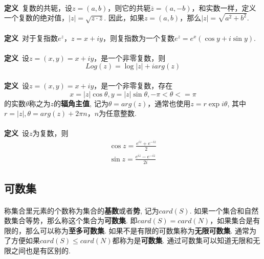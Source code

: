 \paragraph{}
\textbf{定义}\, 复数的共轭，设$z = (a, b)$，则它的共轭$\overline{z} = (a, -b)$，和实数一样，定义一个复数的绝对值，$|z| = \sqrt{z\cdot \overline{z}}$. 因此，如果$z = (a, b)$，那么$|z| = \sqrt{a^2 + b^2}$.
\paragraph{}
\textbf{定义}\, 对于复指数$e^z$，$z = x + iy$，则复指数为一个复数$e^z = e^x(\cos{y} + i\sin{y})$.

\paragraph{}
\textbf{定义}\, 设$z = (x, y) = x + iy$，是一个非零复数，则
$$
Log(z) = \log{|z|} + iarg(z)
$$


\paragraph{}
\textbf{定义}\, 设$z = (x, y) = x + iy$，是一个非零复数，存在
$$
x = |z|\cos{\theta}, y = |z|\sin{\theta}, -\pi < \theta <= \pi
$$
的实数$\theta$称之为$z$的\textbf{辐角主值}, 记为$\theta = arg(z)$，通常也使用$z = r \exp{i\theta}$, 其中$r = |z|, \theta = arg(z) + 2\pi n$，$n$为任意整数.
\paragraph{}
\textbf{定义}\, 设$z$为复数，则
\begin{align*}
\cos{z} = \frac{e^{iz} + e^{-iz}}{2} \\
\sin{z} = \frac{e^{iz} - e^{-iz}}{2i} 
\end{align*}

\subsection{可数集}
\paragraph{}
称集合里元素的个数称为集合的\textbf{基数}或者\textbf{势}, 记为$card(S)$. 如果一个集合和自然数集合等势，那么称这个集合为\textbf{可数集}. 即$card(S) = card(N)$，如果集合是有限的，那么可以称为\textbf{至多可数集}. 如果不是有限的可数集称为\textbf{无限可数集}. 通常为了方便如果$card(S) \leq card(N)$都称为是\textbf{可数集}. 通过可数集可以知道无限和无限之间也是有区别的.

